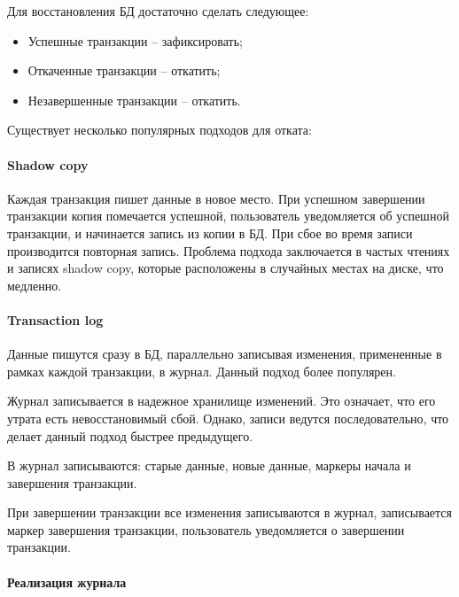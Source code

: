 Для восстановления БД достаточно сделать следующее:

\begin{itemize}
    \item Успешные транзакции -- зафиксировать;
    \item Откаченные транзакции -- откатить;
    \item Незавершенные транзакции -- откатить.
\end{itemize}

Существует несколько популярных подходов для отката:

\paragraph{Shadow copy}

Каждая транзакция пишет данные в новое место. При успешном завершении
транзакции копия помечается успешной, пользователь уведомляется об успешной
транзакции, и начинается запись из копии в БД. При сбое во время записи
производится повторная запись. Проблема подхода заключается в частых чтениях и
записях shadow copy, которые расположены в случайных местах на диске, что
медленно.

\paragraph{Transaction log}

Данные пишутся сразу в БД, параллельно записывая изменения, примененные в
рамках каждой транзакции, в журнал. Данный подход более популярен.

Журнал записывается в надежное хранилище изменений. Это означает,
что его утрата есть невосстановимый сбой. Однако, записи ведутся
последовательно, что делает данный подход быстрее предыдущего.

В журнал записываются: старые данные, новые данные, маркеры начала и завершения
транзакции.

При завершении транзакции все изменения записываются в журнал, записывается
маркер завершения транзакции, пользователь уведомляется о завершении
транзакции.

\paragraph{Реализация журнала}


